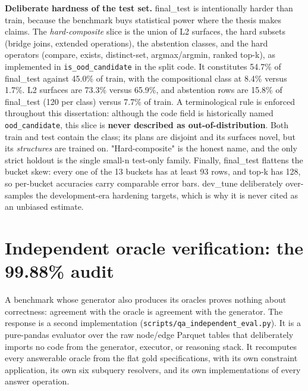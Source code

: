 \documentclass[10pt]{article} %
\begin{document}
\textbf{Deliberate hardness of the test set.} final\_test is intentionally harder than train, because the benchmark buys statistical power where the thesis makes claims. The \emph{hard-composite} slice is the union of L2 surfaces, the hard subsets (bridge joins, extended operations), the abstention classes, and the hard operators (compare, exists, distinct-set, argmax/argmin, ranked top-k), as implemented in \texttt{is\_ood\_candidate} in the split code. It constitutes 54.7\% of final\_test against 45.0\% of train, with the compositional class at 8.4\% versus 1.7\%. L2 surfaces are 73.3\% versus 65.9\%, and abstention rows are 15.8\% of final\_test (120 per class) versus 7.7\% of train. A terminological rule is enforced throughout this dissertation: although the code field is historically named \texttt{ood\_candidate}, this slice is \textbf{never described as out-of-distribution}. Both train and test contain the class; its plans are disjoint and its surfaces novel, but its \emph{structures} are trained on. "Hard-composite" is the honest name, and the only strict holdout is the single small-n test-only family. Finally, final\_test flattens the bucket skew: every one of the 13 buckets has at least 93 rows, and top-k has 128, so per-bucket accuracies carry comparable error bars. dev\_tune deliberately over-samples the development-era hardening targets, which is why it is never cited as an unbiased estimate.

\section{Independent oracle verification: the 99.88\% audit}\label{sec:independent-oracle-verification-the-99-8}

A benchmark whose generator also produces its oracles proves nothing about correctness: agreement with the oracle is agreement with the generator. The response is a second implementation (\texttt{scripts/qa\_independent\_eval.py}). It is a pure-pandas evaluator over the raw node/edge Parquet tables that deliberately imports no code from the generator, executor, or reasoning stack. It recomputes every answerable oracle from the flat gold specifications, with its own constraint application, its own six subquery resolvers, and its own implementations of every answer operation.
\end{document}
